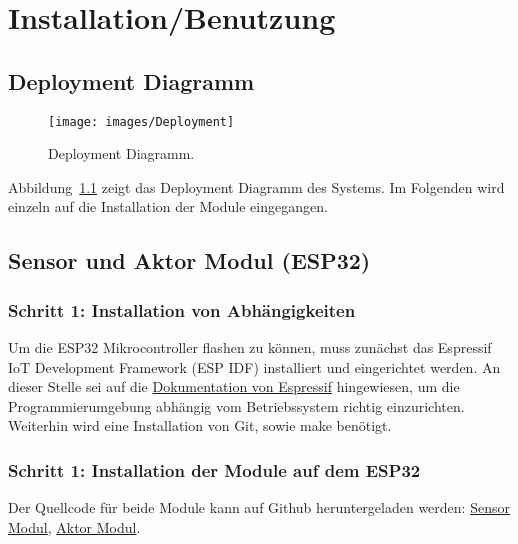 \chapter{Installation/Benutzung}
\label{cha:Installation/Benutzung}

\section{Deployment Diagramm}

\begin{figure}[hbt]
	\centering
	\texttt{[image: images/Deployment]}
	\caption[Deployment Diagramm]{Deployment Diagramm.}
	\label{fig:deployment_diagramm}
\end{figure}

Abbildung~\ref{fig:deployment_diagramm} zeigt das Deployment Diagramm des Systems. Im Folgenden wird einzeln auf die Installation der Module eingegangen.

\section{Sensor und Aktor Modul (ESP32)}
\label{cha:Installation_IDF}
\subsection{Schritt 1: Installation von Abhängigkeiten}
Um die ESP32 Mikrocontroller flashen zu können, muss zunächst das Espressif IoT Development Framework (ESP IDF) installiert und eingerichtet werden. An dieser Stelle sei auf die \href{https://docs.espressif.com/projects/esp-idf/en/latest/index.html}{Dokumentation von Espressif} hingewiesen, um die Programmierumgebung abhängig vom Betriebssystem richtig einzurichten. Weiterhin wird eine Installation von Git, sowie make benötigt.

\subsection{Schritt 1: Installation der Module auf dem ESP32}
Der Quellcode für beide Module kann auf Github heruntergeladen werden: \href{https://github.com/maxbachmann-university/esp32-sensor-modul}{Sensor Modul}, \href{https://github.com/maxbachmann-university/esp32-actuator-module}{Aktor Modul}.

